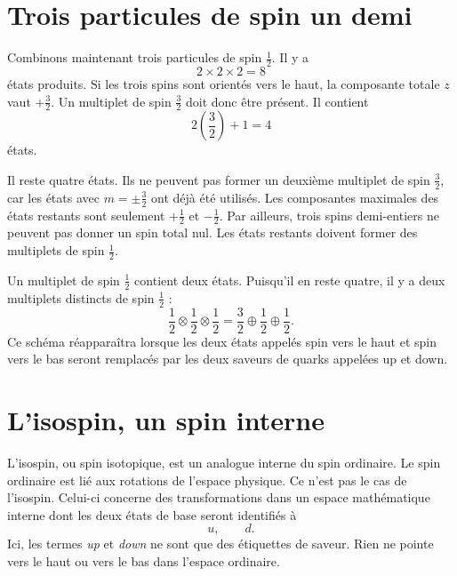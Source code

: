 \section{Trois particules de spin un demi}

Combinons maintenant trois particules de spin \(\tfrac12\). Il y a
\begin{equation}
2\times2\times2=8
\end{equation}
états produits. Si les trois spins sont orientés vers le haut, la composante totale \(z\) vaut \(+\tfrac32\). Un multiplet de spin \(\tfrac32\) doit donc être présent. Il contient
\begin{equation}
2\left(\frac32\right)+1=4
\end{equation}
états.

Il reste quatre états. Ils ne peuvent pas former un deuxième multiplet de spin \(\tfrac32\), car les états avec \(m=\pm\tfrac32\) ont déjà été utilisés. Les composantes maximales des états restants sont seulement \(+\tfrac12\) et \(-\tfrac12\). Par ailleurs, trois spins demi-entiers ne peuvent pas donner un spin total nul. Les états restants doivent former des multiplets de spin \(\tfrac12\).

Un multiplet de spin \(\tfrac12\) contient deux états. Puisqu’il en reste quatre, il y a deux multiplets distincts de spin \(\tfrac12\) :
\begin{equation}
\frac12\otimes\frac12\otimes\frac12
=
\frac32\oplus\frac12\oplus\frac12.
\end{equation}
Ce schéma réapparaîtra lorsque les deux états appelés spin vers le haut et spin vers le bas seront remplacés par les deux saveurs de quarks appelées up et down.

\section{L’isospin, un spin interne}

L’isospin, ou spin isotopique, est un analogue interne du spin ordinaire. Le spin ordinaire est lié aux rotations de l’espace physique. Ce n’est pas le cas de l’isospin. Celui-ci concerne des transformations dans un espace mathématique interne dont les deux états de base seront identifiés à
\begin{equation}
u,\qquad d.
\end{equation}
Ici, les termes \emph{up} et \emph{down} ne sont que des étiquettes de saveur. Rien ne pointe vers le haut ou vers le bas dans l’espace ordinaire.

